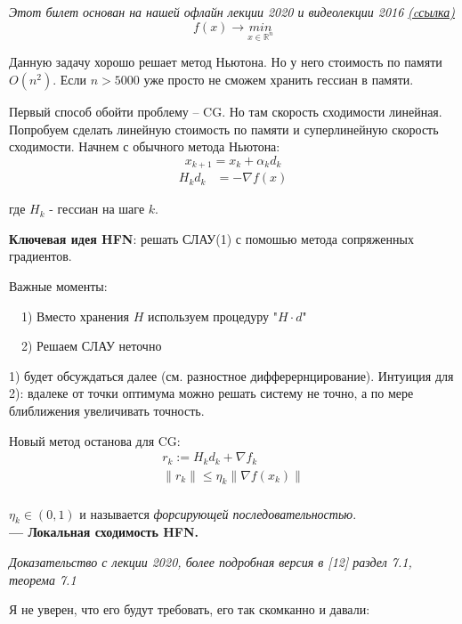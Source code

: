 \textit{Этот билет основан на нашей офлайн лекции 2020 и видеолекции 2016}
\hyperref{https://yadi.sk/i/VhIMQ5NKq3r2v}{}{}{\textit{(cсылка)}}
\\
$$f(x) \rightarrow \underset{x\in \mathbb{R}^n}{min}$$

Данную задачу хорошо решает метод Ньютона. Но у него стоимость по памяти $O(n^2)$. Если $n > 5000$ уже просто не сможем хранить гессиан в памяти.

Первый способ обойти проблему -- CG. Но там скорость сходимости линейная. Попробуем сделать линейную стоимость по памяти и суперлинейную скорость сходимости. Начнем с обычного метода Ньютона:
$$
x_{k+1} = x_k + \alpha_k d_k
$$
\begin{align}
    H_k d_k &= -\nabla f(x) \tag{1}
\end{align}

где $H_k$ - гессиан на шаге $k$.

\noindent \textbf{Ключевая идея HFN}: решать СЛАУ(1) с помошью метода сопряженных градиентов.

Важные моменты:

\ \ 1) Вместо хранения $H$ используем процедуру "$H\cdot d$"

\ \ 2) Решаем СЛАУ неточно

1) будет обсуждаться далее (см. разностное дифферернцирование). Интуиция для 2): вдалеке от точки оптимума можно решать систему не точно, а по мере блиближения увеличивать точность.

\noindent Новый метод останова для CG:
\begin{gather*}
    r_k := H_k d_k + \nabla f_k\\
    \| r_k\| \le \eta_k\|\nabla f(x_k)\|\\
\end{gather*}

$\eta_k \in (0, 1)$ и называется \textit{форсирующей последовательностью}.
\\

\noindent \textbf{--- Локальная сходимость HFN.}

\textit{Доказательство с лекции 2020, более подробная версия в [12] раздел 7.1, теорема 7.1}

Я не уверен, что его будут требовать, его так скомканно и давали:

